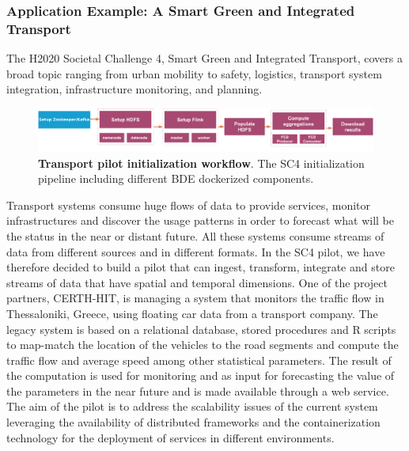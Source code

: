 \subsubsection{Application Example: A Smart Green and Integrated Transport	}
The H2020 Societal Challenge 4, Smart Green and Integrated Transport, covers a broad topic ranging from urban mobility to safety, logistics, transport system integration, infrastructure monitoring, and planning.
\begin{figure}[h]
\centering
	\includegraphics[width=\textwidth]{images/7_implemenation_and_usecases/SC4_Arch.pdf}
	\caption{\textbf{Transport pilot initialization workflow}.
	The SC4 initialization pipeline including different BDE dockerized components.
	}
	\label{fig:SC4-pipeline}
\end{figure}
Transport systems consume huge flows of data to provide services, monitor infrastructures and discover the usage patterns in order to forecast what will be the status in the near or distant future. 
All these systems consume streams of data from different sources and in different formats. 
In the SC4 pilot, we have therefore decided to build a pilot that can ingest, transform, integrate and store streams of data that have spatial and temporal dimensions. 
One of the project partners, CERTH-HIT, is managing a system that monitors the traffic flow in Thessaloniki, Greece, using floating car data from a transport company. 
The legacy system is based on a relational database, stored procedures and R scripts to map-match the location of the vehicles to the road segments and compute the traffic flow and average speed among other statistical parameters. 
The result of the computation is used for monitoring and as input for forecasting the value of the parameters in the near future and is made available through a web service. 
The aim of the pilot is to address the scalability issues of the current system leveraging the availability of distributed frameworks and the containerization technology for the deployment of services in different environments.

